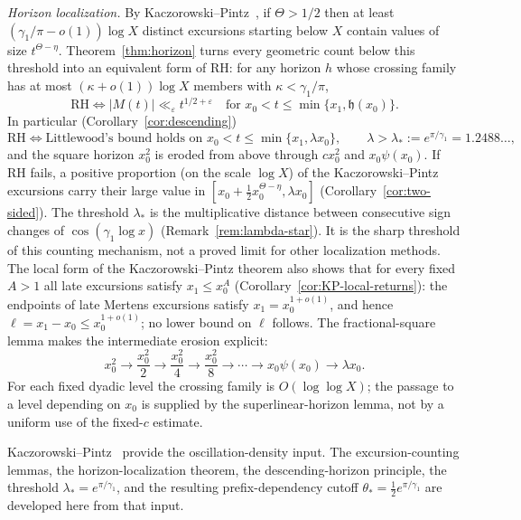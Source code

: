 \documentclass[11pt]{amsart}
\numberwithin{equation}{section}
\theoremstyle{plain}
\theoremstyle{definition}
\theoremstyle{remark}
\newcommand{\eps}{\varepsilon}
\begin{document}
\smallskip\noindent\emph{Horizon localization.} By
Kaczorowski--Pintz~\cite{KP86}, if $\Theta>1/2$ then at least
$(\gamma_1/\pi-o(1))\log X$ distinct excursions starting below $X$ contain
values of size $t^{\Theta-\eta}$. Theorem~\ref{thm:horizon} turns every
geometric count below this threshold into an equivalent form of RH: for any
horizon $h$ whose crossing family has at most $(\kappa+o(1))\log X$ members
with $\kappa<\gamma_1/\pi$,
\[
\mathrm{RH}\iff |M(t)|\ll_\eps t^{1/2+\eps}\quad\text{for }x_0<t\le\min\{x_1,\mathfrak h(x_0)\}.
\]
In particular (Corollary~\ref{cor:descending})
\[
\mathrm{RH}\iff\text{Littlewood's bound holds on }x_0<t\le\min\{x_1,\lambda x_0\},
\qquad\lambda>\lambda_*:=e^{\pi/\gamma_1}=1.2488\ldots,
\]
and the square horizon $x_0^2$ is eroded from above through $cx_0^2$ and
$x_0\psi(x_0)$. If RH fails, a positive proportion (on the scale $\log X$) of the
Kaczorowski--Pintz excursions carry their large value in
$[x_0+\frac12x_0^{\Theta-\eta},\lambda x_0]$ (Corollary~\ref{cor:two-sided}). The threshold $\lambda_*$ is the multiplicative distance
between consecutive sign changes of $\cos(\gamma_1\log x)$
(Remark~\ref{rem:lambda-star}). It is the sharp threshold of this counting mechanism, not a
proved limit for other localization methods. The local form of the
Kaczorowski--Pintz theorem also shows that for every fixed $A>1$ all late
excursions satisfy $x_1\le x_0^A$ (Corollary~\ref{cor:KP-local-returns}):
the endpoints of late Mertens excursions satisfy $x_1=x_0^{1+o(1)}$, and
hence $\ell=x_1-x_0\le x_0^{1+o(1)}$; no lower bound on $\ell$ follows.  The fractional-square lemma makes the
intermediate erosion explicit:
\[
x_0^2\longrightarrow \frac{x_0^2}{2}\longrightarrow
\frac{x_0^2}{4}\longrightarrow\frac{x_0^2}{8}\longrightarrow\cdots
\longrightarrow x_0\psi(x_0)\longrightarrow\lambda x_0.
\]
For each fixed dyadic level the crossing family is $O(\log\log X)$; the
passage to a level depending on $x_0$ is supplied by the superlinear-horizon
lemma, not by a uniform use of the fixed-$c$ estimate.

Kaczorowski--Pintz~\cite{KP86} provide the oscillation-density input.  The
excursion-counting lemmas, the horizon-localization theorem, the
descending-horizon principle, the threshold
$\lambda_*=e^{\pi/\gamma_1}$, and the resulting prefix-dependency cutoff
$\theta_*=\tfrac12e^{\pi/\gamma_1}$ are developed here from that input.
\end{document}
